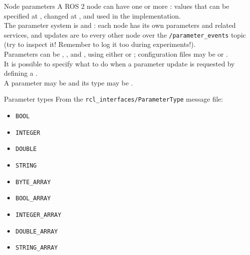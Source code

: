 \begin{frame}{Node parameters}
	A ROS 2 node can have one or more : values that can be specified at , changed at , and used in the implementation.\\\vspace{10pt}
	The parameter system is  and : each node has its own parameters and related services, and updates are  to every other node over the \texttt{/parameter\_events} topic (try to inspect it! Remember to log it too during experiments!).\\\vspace{10pt}
	Parameters can be , ,  and , using either  or ;  configuration files may be  or .\\\vspace{10pt}
	It is possible to specify what to do when a parameter update is requested by defining a .\\\vspace{10pt}
	A parameter may be  and its type may be .
\end{frame}

\begin{frame}{Parameter types}
	From the \texttt{rcl\_interfaces/ParameterType} message file:
	\begin{itemize}
		\item \texttt{BOOL}
		\item \texttt{INTEGER}
		\item \texttt{DOUBLE}
		\item \texttt{STRING}
		\item \texttt{BYTE\_ARRAY}
		\item \texttt{BOOL\_ARRAY}
		\item \texttt{INTEGER\_ARRAY}
		\item \texttt{DOUBLE\_ARRAY}
		\item \texttt{STRING\_ARRAY}
	\end{itemize}
\end{frame}

